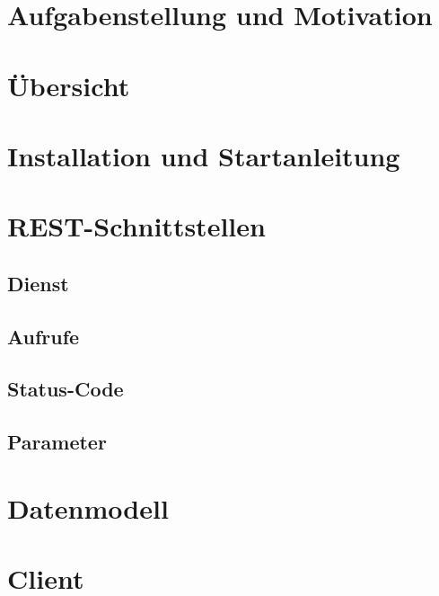 \documentclass[12pt, a4paper, headings]{scrreprt}
\theoremstyle{definition}
\begin{document}

\tableofcontents

\newpage

\chapter{Aufgabenstellung und Motivation}




\chapter{Übersicht}




\chapter{Installation und Startanleitung}





\chapter{REST-Schnittstellen}


\section{Dienst}


\section{Aufrufe}


\section{Status-Code}


\section{Parameter}





\chapter{Datenmodell}





\chapter{Client}
\end{document}
